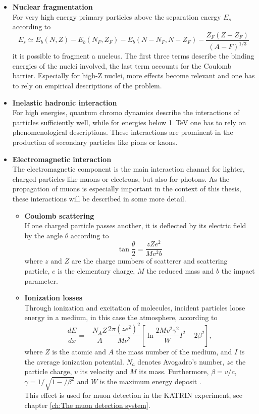     \begin{itemize}
    	\item {\bf Nuclear fragmentation}\\
    	For very high energy primary particles above the separation energy $E_s$ according to 
		\begin{equation}
			E_s \simeq E_b(N,Z) - E_b(N_F, Z_F) - E_b(N - N_F, N - Z_F) - \frac{Z_F(Z -Z_F)}{(A-F)^{1/3}}
		\end{equation}
		it is possible to fragment a nucleus. The first three terms describe the binding energies of the nuclei involved, the last term accounts for the Coulomb barrier. Especially for high-Z nuclei, more effects become relevant and one has to rely on empirical descriptions of the problem.
		\item{\bf Inelastic hadronic interaction}\\
		For high energies, quantum chromo dynamics describe the interactions of particles sufficiently well, while for energies below \SI{1}{\TeV} one has to rely on phenomenological descriptions. These interactions are prominent in the production of secondary particles like pions or kaons.
		
		\item{\bf Electromagnetic interaction}\\
		The electromagnetic component is the main interaction channel for lighter, charged particles like muons or electrons, but also for photons. As the propagation of muons is especially important in the context of this thesis, these interactions will be described in some more detail.
	
	
	\begin{itemize}
		\item {\bf Coulomb scattering}\\
		If one charged particle passes another, it is deflected by its electric field by the angle $\theta$ according to
		\begin{equation}
			\tan{\frac{\theta}{2}} = \frac{zZe^2}{Mv^2b}
		\end{equation}
		where $z$ and $Z$ are the charge numbers of scatterer and scattering particle, $e$ is the elementary charge, $M$ the reduced mass and $b$ the impact parameter.
		\item{\bf Ionization losses}\\
		Through ionization and excitation of molecules, incident particles loose energy in a medium, in this case the atmosphere, according to
		\begin{equation}
			\frac{dE}{dx} = -\frac{N_AZ}{A}\frac{2\pi\left(ze^2\right)^2}{M\nu^2}\left[\ln{\frac{2Mv^2\gamma^2}W{I^2}}-2\beta^2\right],
		\end{equation}
		where $Z$ is the atomic and $A$ the mass number of the medium, and $I$ is the average ionization potential. $N_a$ denotes Avogadro's number, $ze$ the particle charge, $v$ its velocity and $M$ its mass. Furthermore, $\beta = v/c$, $\gamma = 1/\sqrt{1-/\beta^2}$ and $W$ is the maximum energy deposit \cite{Hayakawa}.\\
		This effect is used for muon detection in the KATRIN experiment, see chapter \ref{ch:The muon detection system}.
		

\end{itemize}
\end{itemize}
